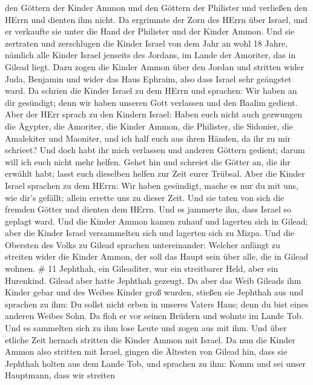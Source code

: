 den Göttern der Kinder Ammon und den Göttern der Philister und verließen
den HErrn und dienten ihm nicht.  Da ergrimmte der Zorn des
HErrn über Israel, und er verkaufte sie unter die Hand der Philister und
der Kinder Ammon.  Und sie zertraten und zerschlugen die
Kinder Israel von dem Jahr an wohl 18 Jahre, nämlich alle Kinder Israel
jenseits des Jordans, im Lande der Amoriter, das in Gilead liegt.
 Dazu zogen die Kinder Ammon über den Jordan und stritten
wider Juda, Benjamin und wider das Haus Ephraim, also dass Israel sehr
geängstet ward.  Da schrien die Kinder Israel zu dem HErrn
und sprachen: Wir haben an dir gesündigt; denn wir haben unseren Gott
verlassen und den Baalim gedient.  Aber der HErr sprach zu
den Kindern Israel: Haben euch nicht auch gezwungen die Ägypter, die
Amoriter, die Kinder Ammon, die Philister,  die Sidonier,
die Amalekiter und Maoniter, und ich half euch aus ihren Händen, da ihr
zu mir schrieet?  Und doch habt ihr mich verlassen und
anderen Göttern gedient; darum will ich euch nicht mehr helfen.
 Gehet hin und schreiet die Götter an, die ihr erwählt
habt; lasst euch dieselben helfen zur Zeit eurer Trübsal. 
Aber die Kinder Israel sprachen zu dem HErrn: Wir haben gesündigt, mache
es nur du mit uns, wie dir's gefällt; allein errette uns zu dieser Zeit.
 Und sie taten von sich die fremden Götter und dienten dem
HErrn. Und es jammerte ihn, dass Israel so geplagt ward. 
Und die Kinder Ammon kamen zuhauf und lagerten sich in Gilead; aber die
Kinder Israel versammelten sich und lagerten sich zu Mizpa.
 Und die Obersten des Volks zu Gilead sprachen
untereinander: Welcher anfängt zu streiten wider die Kinder Ammon, der
soll das Haupt sein über alle, die in Gilead wohnen. \# 11 
Jephthah, ein Gileaditer, war ein streitbarer Held, aber ein Hurenkind.
Gilead aber hatte Jephthah gezeugt.  Da aber das Weib
Gileads ihm Kinder gebar und des Weibes Kinder groß wurden, stießen sie
Jephthah aus und sprachen zu ihm: Du sollst nicht erben in unseres
Vaters Haus; denn du bist eines anderen Weibes Sohn.  Da
floh er vor seinen Brüdern und wohnte im Lande Tob. Und es sammelten
sich zu ihm lose Leute und zogen aus mit ihm.  Und über
etliche Zeit hernach stritten die Kinder Ammon mit Israel. 
Da nun die Kinder Ammon also stritten mit Israel, gingen die Ältesten
von Gilead hin, dass sie Jephthah holten aus dem Lande Tob, 
und sprachen zu ihm: Komm und sei unser Hauptmann, dass wir streiten
